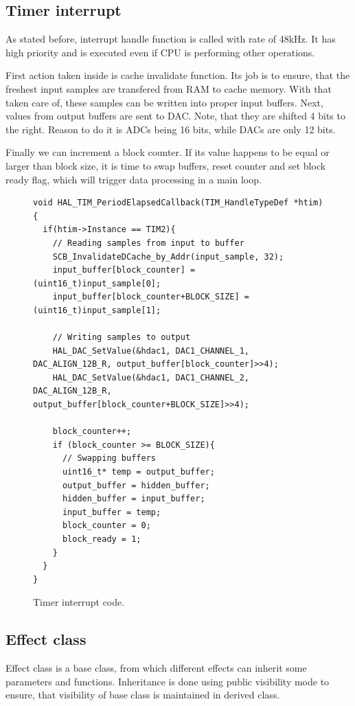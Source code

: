 \documentclass[a4paper,twoside,12pt]{book}
\begin{document}
\subsection{Timer interrupt}
As stated before, interrupt handle function is called with rate of 48kHz.
It has high priority and
is executed even if CPU is performing other operations.

First action taken inside is cache invalidate function.
Its job is to ensure, that the freshest input samples
are transfered from RAM to cache memory.
With that taken care of, these samples can be written into
proper input buffers.
Next, values from output buffers are sent to DAC.
Note, that they are shifted 4 bits to the right.
Reason to do it is ADCs being 16 bits, while DACs are only 12 bits.

Finally we can increment a block counter.
If its value happens to be equal or larger than block size,
it is time to swap buffers, reset counter and set block ready flag,
which will trigger data processing in a main loop.

\begin{figure}[H]
\centering
\begin{lstlisting}
void HAL_TIM_PeriodElapsedCallback(TIM_HandleTypeDef *htim){
  if(htim->Instance == TIM2){
    // Reading samples from input to buffer
    SCB_InvalidateDCache_by_Addr(input_sample, 32);
    input_buffer[block_counter] = (uint16_t)input_sample[0];
    input_buffer[block_counter+BLOCK_SIZE] = (uint16_t)input_sample[1];

    // Writing samples to output
    HAL_DAC_SetValue(&hdac1, DAC1_CHANNEL_1, DAC_ALIGN_12B_R, output_buffer[block_counter]>>4);
    HAL_DAC_SetValue(&hdac1, DAC1_CHANNEL_2, DAC_ALIGN_12B_R, output_buffer[block_counter+BLOCK_SIZE]>>4);

    block_counter++;
    if (block_counter >= BLOCK_SIZE){
      // Swapping buffers
      uint16_t* temp = output_buffer;
      output_buffer = hidden_buffer;
      hidden_buffer = input_buffer;
      input_buffer = temp;
      block_counter = 0;
      block_ready = 1;
    }
  }
}
\end{lstlisting}
\caption{Timer interrupt code.}
\label{fig:timer}
\end{figure}

\subsection{Effect class}
Effect class is a base class, from which different effects can inherit
some parameters and functions.
Inheritance is done using public visibility mode to ensure,
that visibility of base class is maintained in derived class.
\end{document}
